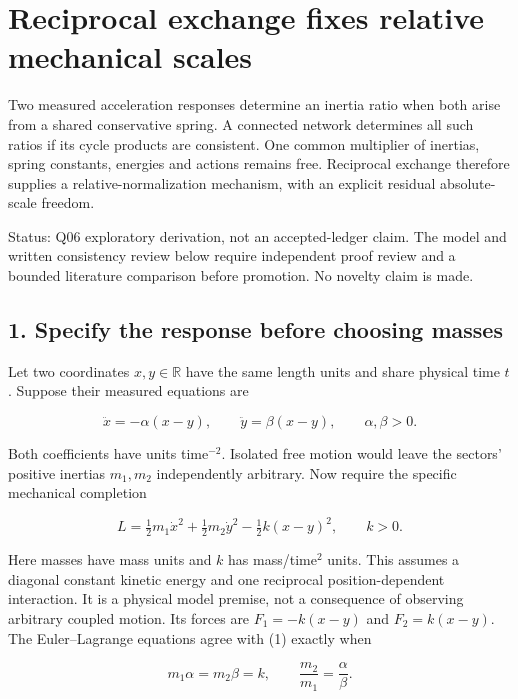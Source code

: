 \documentclass[11pt,a4paper]{article}
\begin{document}
\hypertarget{reciprocal-exchange-fixes-relative-mechanical-scales}{%
\section{Reciprocal exchange fixes relative mechanical
scales}\label{reciprocal-exchange-fixes-relative-mechanical-scales}}

Two measured acceleration responses determine an inertia ratio when both
arise from a shared conservative spring. A connected network determines
all such ratios if its cycle products are consistent. One common
multiplier of inertias, spring constants, energies and actions remains
free. Reciprocal exchange therefore supplies a relative-normalization
mechanism, with an explicit residual absolute-scale freedom.

Status: Q06 exploratory derivation, not an accepted-ledger claim. The
model and written consistency review below require independent proof
review and a bounded literature comparison before promotion. No novelty
claim is made.

\hypertarget{specify-the-response-before-choosing-masses}{%
\subsection{1. Specify the response before choosing
masses}\label{specify-the-response-before-choosing-masses}}

Let two coordinates \(x,y\in\mathbb R\) have the same length units and
share physical time \(t\). Suppose their measured equations are

\[\ddot x=-\alpha(x-y),\qquad
\ddot y=\beta(x-y),\qquad \alpha,\beta>0. \tag{1}\]

Both coefficients have units time\(^{-2}\). Isolated free motion would
leave the sectors' positive inertias \(m_1,m_2\) independently
arbitrary. Now require the specific mechanical completion

\[L=\tfrac12m_1\dot x^2+\tfrac12m_2\dot y^2
-\tfrac12k(x-y)^2,\qquad k>0. \tag{2}\]

Here masses have mass units and \(k\) has mass/time\(^2\) units. This
assumes a diagonal constant kinetic energy and one reciprocal
position-dependent interaction. It is a physical model premise, not a
consequence of observing arbitrary coupled motion. Its forces are
\(F_1=-k(x-y)\) and \(F_2=k(x-y)\). The Euler--Lagrange equations agree
with (1) exactly when

\[m_1\alpha=m_2\beta=k,
\qquad \frac{m_2}{m_1}=\frac\alpha\beta. \tag{3}\]
\end{document}
